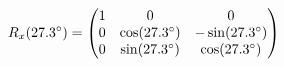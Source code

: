 \documentclass[preview]{standalone}
\begin{document}
\begin{align*}
\special{dvisvgm:raw <g id='unique000'>}R_x(27.3^\circ) = \begin{pmatrix} 1 & 0 & 0 \\ 0 & \cos(27.3^\circ) & -\sin(27.3^\circ) \\ 0 & \sin(27.3^\circ) & \cos(27.3^\circ) \end{pmatrix}\special{dvisvgm:raw </g>}
\end{align*}
\end{document}
